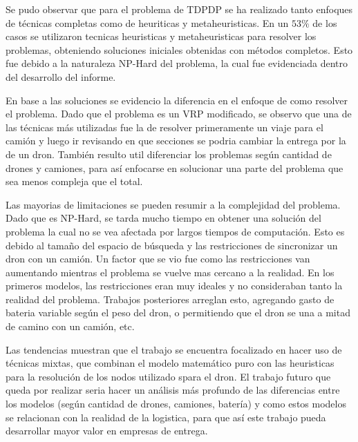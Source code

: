 
Se pudo observar que para el problema de TDPDP se ha realizado tanto enfoques de técnicas completas como de heuriticas y metaheuristicas. En un $53\%$ de los casos se utilizaron tecnicas heuristicas y metaheuristicas para resolver los problemas, obteniendo soluciones iniciales obtenidas con métodos completos. Esto fue debido a la naturaleza NP-Hard del problema, la cual fue evidenciada dentro del desarrollo del informe.

En base a las soluciones se evidencio la diferencia en el enfoque de como resolver el problema. Dado que el problema es un VRP modificado, se observo que una de las técnicas más utilizadas fue la de resolver primeramente un viaje para el camión y luego ir revisando en que secciones se podria cambiar la entrega por la de un dron. También resulto util diferenciar los problemas según cantidad de drones y camiones, para así enfocarse en solucionar una parte del problema que sea menos compleja que el total.

Las mayorias de limitaciones se pueden resumir a la complejidad del problema. Dado que es NP-Hard, se tarda mucho tiempo en obtener una solución del problema la cual no se vea afectada por largos tiempos de computación. Esto es debido al tamaño del espacio de búsqueda y las restricciones de sincronizar un dron con un camión. Un factor que se vio fue como las restricciones van aumentando mientras el problema se vuelve mas cercano a la realidad. En los primeros modelos, las restricciones eran muy ideales y no consideraban tanto la realidad del problema. Trabajos posteriores arreglan esto, agregando gasto de bateria variable según el peso del dron, o permitiendo que el dron se una a mitad de camino con un camión, etc.

Las tendencias muestran que el trabajo se encuentra focalizado en hacer uso de técnicas mixtas, que combinan el modelo matemático puro con las heuristicas para la resolución de los nodos utilizado spara el dron. El trabajo futuro que queda por realizar seria hacer un análisis más profundo de las diferencias entre los modelos (según cantidad de drones, camiones, batería) y como estos modelos se relacionan con la realidad de la logistica, para que así este trabajo pueda desarrollar mayor valor en empresas de entrega.
